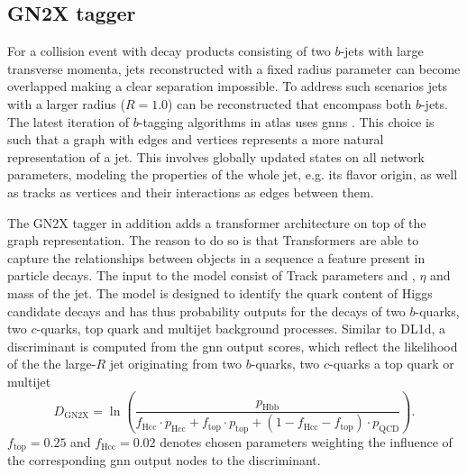 \subsection{GN2X tagger}\label{sec:gn2x}
For a collision event with decay products consisting of two $b$-jets with large transverse momenta, jets reconstructed with a fixed radius parameter can become overlapped making a clear separation impossible. To address such scenarios jets with a larger radius ($R=1.0$) can be reconstructed  that encompass both $b$-jets. The latest iteration of $b$-tagging algorithms in \ac{atlas} uses \acp{gnn} \citep{shlomi2020graph, ATL-PHYS-PUB-2022-027}. This choice is such that a graph with edges and vertices represents a more natural representation of a jet. This involves globally updated states on all network parameters, modeling the properties of the whole jet, e.g. its flavor origin, as well as tracks as vertices and their interactions as edges between them. 

The GN2X tagger in addition adds a transformer architecture \citep{ATL-PHYS-PUB-2023-021} on top of the graph representation. The reason to do so is that Transformers are able to capture the relationships between objects in a sequence a feature present in particle decays. The input to the model consist of Track parameters and \pt, $\eta$ and mass of the jet. The model is designed to identify the quark content of Higgs candidate decays and has thus probability outputs for the decays of two $b$-quarks, two $c$-quarks, top quark and multijet background processes. Similar to DL1d, a discriminant is computed from the \ac{gnn} output scores, which reflect the likelihood of the the large-$R$ jet originating from two $b$-quarks, two $c$-quarks a top quark or multijet 
\begin{equation}
  D_{\text{GN2X}}=\ln\left({\frac{p_{\text{Hbb}}}{
    f_{\text{Hcc}}\cdot p_{\text{Hcc}}+
    f_{\text{top}}\cdot p_{\text{top}}+
    (1-f_{\text{Hcc}}-f_{\text{top}})\cdot p_{\text{QCD}}}}\right).
\end{equation}
$f_\text{top}=0.25$ and $f_\text{Hcc}=0.02$ denotes chosen parameters weighting the influence of the corresponding \ac{gnn} output nodes to the discriminant. 




